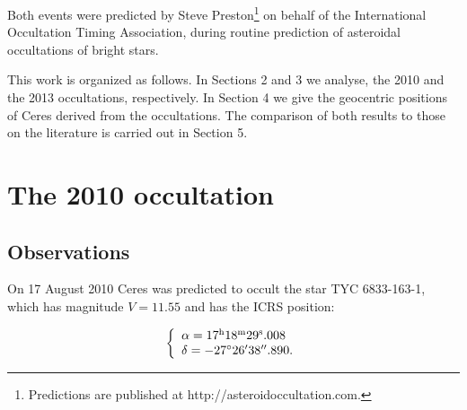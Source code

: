 \documentclass[useAMS,usenatbib]{mn2e}
\begin{document}
Both events were predicted by Steve Preston\footnote{Predictions are published at http://asteroidoccultation.com.} on behalf of the International Occultation Timing Association, during routine prediction of asteroidal occultations of bright stars.

This work is organized as follows. In Sections 2 and 3 we analyse, the 2010 and the 2013 occultations, respectively. In Section 4 we give the geocentric positions of Ceres derived from the occultations. The comparison of both results to those on the literature is carried out in Section 5.



\section{The 2010 occultation}

\subsection{Observations}


On 17 August 2010 Ceres was predicted to occult the star TYC 6833-163-1, %
 which has magnitude $V = 11.55$ and has the ICRS position:


\begin{equation}
\left\{ 
  \begin{array}{l l}
    \alpha = 17^{\text{h}}18^{\text{m}}29^{\text{s}}.008\\
    \delta = -27\hbox{$^\circ$} 26\hbox{$^\prime$} 38\hbox{$^{\prime\prime}$}.890.
  \end{array}
\right.
\label{Eq: 2010-coord}
\end{equation}

%
%
\end{document}

